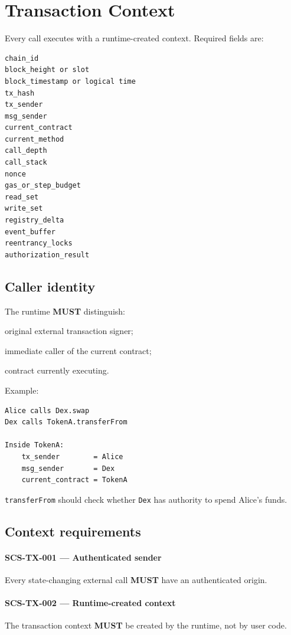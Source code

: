 \documentclass[11pt]{article}
\newcommand{\MUST}{\textbf{MUST}}
\newcommand{\req}[2]{\paragraph{#1}#2\par}
\newcommand{\code}[1]{\texttt{#1}}
\begin{document}
\section{Transaction Context}

Every call executes with a runtime-created context. Required fields are:

\begin{lstlisting}
chain_id
block_height or slot
block_timestamp or logical time
tx_hash
tx_sender
msg_sender
current_contract
current_method
call_depth
call_stack
nonce
gas_or_step_budget
read_set
write_set
registry_delta
event_buffer
reentrancy_locks
authorization_result
\end{lstlisting}

\subsection{Caller identity}

The runtime \MUST{} distinguish:

\begin{description}[leftmargin=3.3cm]
  \item[\code{tx\_sender}] original external transaction signer;
  \item[\code{msg\_sender}] immediate caller of the current contract;
  \item[\code{current\_contract}] contract currently executing.
\end{description}

Example:

\begin{lstlisting}
Alice calls Dex.swap
Dex calls TokenA.transferFrom

Inside TokenA:
    tx_sender        = Alice
    msg_sender       = Dex
    current_contract = TokenA
\end{lstlisting}

\code{transferFrom} should check whether \code{Dex} has authority to spend Alice's funds.

\subsection{Context requirements}

\req{SCS-TX-001 --- Authenticated sender}{Every state-changing external call \MUST{} have an authenticated origin.}

\req{SCS-TX-002 --- Runtime-created context}{The transaction context \MUST{} be created by the runtime, not by user code.}
\end{document}
